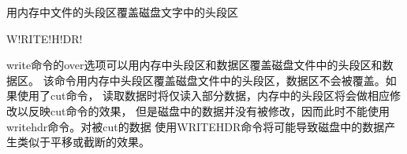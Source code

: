 \label{cmd:writehdr}

用内存中文件的头段区覆盖磁盘文字中的头段区

\begin{SACSTX}
W!RITE!H!DR!
\end{SACSTX}

write命令的over选项可以用内存中头段区和数据区覆盖磁盘文件中的头段区和数据区。
该命令用内存中头段区覆盖磁盘文件中的头段区，数据区不会被覆盖。如果使用了cut命令，
读取数据时将仅读入部分数据，内存中的头段区将会做相应修改以反映cut命令的效果，
但是磁盘中的数据并没有被修改，因而此时不能使用writehdr命令。对被cut的数据
使用WRITEHDR命令将可能导致磁盘中的数据产生类似于平移或截断的效果。
